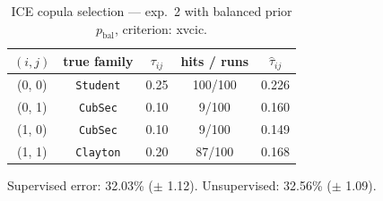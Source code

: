 \begin{table}[htbp]
  \centering
  \caption{ICE copula selection — exp.\ 2 with balanced prior $p_{\text{bal}}$, criterion: xvcic.}
  \label{tab:exp3-exp2_bal_p__xvcic}
  \begin{tabular}{ccccc}
    \toprule
    $(i, j)$ & true family & $\tau_{ij}$ & hits / runs & $\hat\tau_{ij}$ \\
    \midrule
    (0, 0) & \texttt{Student} & 0.25 & 100/100 & 0.226 \\
    (0, 1) & \texttt{CubSec} & 0.10 & 9/100 & 0.160 \\
    (1, 0) & \texttt{CubSec} & 0.10 & 9/100 & 0.149 \\
    (1, 1) & \texttt{Clayton} & 0.20 & 87/100 & 0.168 \\
    \bottomrule
  \end{tabular}
  \par\smallskip Supervised error: 32.03\% ($\pm$ 1.12). Unsupervised: 32.56\% ($\pm$ 1.09).
\end{table}
